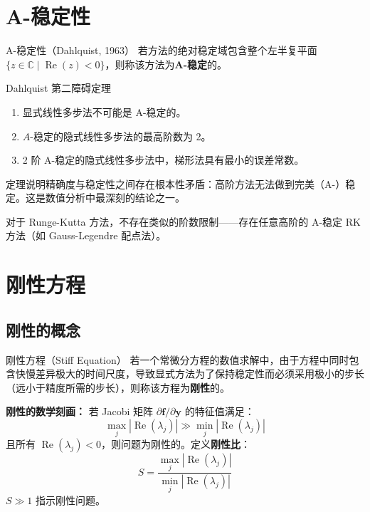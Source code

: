 \section{A-稳定性}

\begin{mydefinition}{A-稳定性（Dahlquist, 1963）}
	若方法的绝对稳定域包含整个左半复平面 $\{ z \in \mathbb{C} \mid \operatorname{Re}(z) < 0 \}$，则称该方法为\textbf{A-稳定}的。
\end{mydefinition}

\begin{theorem}{Dahlquist 第二障碍定理}
	\begin{enumerate}
		\item 显式线性多步法不可能是 A-稳定的。
		\item $A$-稳定的隐式线性多步法的最高阶数为 2。
		\item 2 阶 A-稳定的隐式线性多步法中，梯形法具有最小的误差常数。
	\end{enumerate}
\end{theorem}

\begin{remark}
	定理说明精确度与稳定性之间存在根本性矛盾：高阶方法无法做到完美（A-）稳定。这是数值分析中最深刻的结论之一。
\end{remark}

对于 Runge-Kutta 方法，不存在类似的阶数限制——存在任意高阶的 A-稳定 RK 方法（如 Gauss-Legendre 配点法）。

\section{刚性方程}

\subsection{刚性的概念}

\begin{mydefinition}{刚性方程（Stiff Equation）}
	若一个常微分方程的数值求解中，由于方程中同时包含快慢差异极大的时间尺度，导致显式方法为了保持稳定性而必须采用极小的步长（远小于精度所需的步长），则称该方程为\textbf{刚性}的。
\end{mydefinition}

\textbf{刚性的数学刻画：} 若 Jacobi 矩阵 $\partial \mathbf{f}/\partial \mathbf{y}$ 的特征值满足：
\[
\max_j |\operatorname{Re}(\lambda_j)| \gg \min_j |\operatorname{Re}(\lambda_j)|
\]
且所有 $\operatorname{Re}(\lambda_j) < 0$，则问题为刚性的。定义\textbf{刚性比}：
\[
S = \frac{\max_j |\operatorname{Re}(\lambda_j)|}{\min_j |\operatorname{Re}(\lambda_j)|}
\]
$S \gg 1$ 指示刚性问题。

